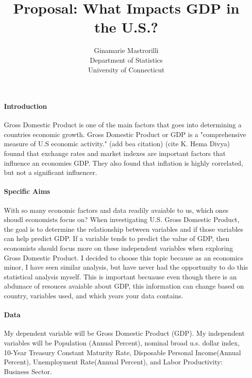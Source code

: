 \documentclass[12pt]{article}
\title{Proposal: What Impacts GDP in the U.S.? }
\author{Ginamarie Mastrorilli\\
  Department of Statistics\\
  University of Connecticut
}
\begin{document}
\maketitle


\paragraph{Introduction}
Gross Domestic Product is one of the main factors that goes into determining a countries economic growth. Gross Domestic Product or GDP is a "comprehensive measure of U.S economic activity." (add bea citation) 
(cite K. Hema Divya) founnd that exchange rates and market indexes are important factors that influence an economies GDP. They also found that inflation is highly correlated, but not a significant influencer.  

\paragraph{Specific Aims}
With so many economic factors and data readily avaiable to us, which ones shoudl economists focus on?
When investigating U.S. Gross Domestic Product, the goal is to determine the relationship between variables and if those variables can help predict GDP.
If a variable tends to predict the value of GDP, then economists should focus more on these independent variables when exploring Gross Domestic Product.
I decided to choose this topic because as an economics minor, I have seen similar analysis, but have never had the opportunity to do this statistical analysis myself. 
This is important becuause even though there is an abdunace of resouces avaiable about GDP, this information can change based on country, variables used, and which years your data contains. 


\paragraph{Data}
My dependent variable will be Gross Domestic Product (GDP).
My independent variables will be Population (Annual Percent), nominal broad u.s. dollar index, 10-Year Treasury Constant Maturity Rate, Disposable Personal Income(Annual Percent), Unemployment Rate(Annual Percent), and Labor Productivity: Business Sector. 
\end{document}

